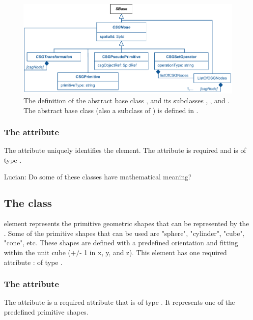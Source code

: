 \begin{figure}[ht]
  \includegraphics{figs/CSGNode-uml}
  \caption{The definition of the abstract base class \CSGNode, and its subclasses \CSGPrimitive, \CSGPseudoPrimitive, and \CSGSetOperator.  The abstract base class \CSGTransformation (also a subclass of \CSGNode) is defined in .}
  \label{CSGNode-uml}
  \label{CSGPrimitive-uml}
  \label{CSGPseudoPrimitive-uml}
  \label{CSGSetOperator-uml}
  \label{ListOfCSGNodes-uml}
\end{figure}

\subsubsection{The  attribute}
The  attribute uniquely identifies the \CSGNode element. The attribute is required and is of type .

{\color{red} Lucian: \notice Do some of these classes have mathematical meaning?}


\subsection{The  class}
\label{CSGPrimitive-class}
\CSGPrimitive element represents the primitive geometric shapes that can be represented by the \CSGeometry. Some of the primitive shapes that can be used are "sphere", "cylinder", "cube", "cone", etc. These shapes are defined with a predefined orientation and fitting within the unit cube (+/- 1 in x, y, and z). This element has one required attribute :  of type .

\subsubsection{The  attribute}
The  attribute is a required attribute that is of type . It represents one of the predefined primitive shapes.

